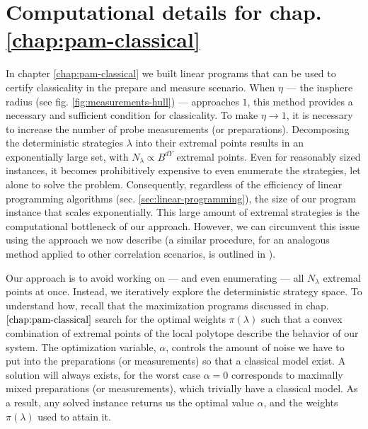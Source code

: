 \chapter{Computational details for chap. \ref{chap:pam-classical}}
\label{ap:a}
\label{ap:a-computational}

    In chapter \ref{chap:pam-classical} we built linear programs that can be used to certify classicality in the prepare and measure scenario. When $\eta$ --- the insphere radius (see fig. \ref{fig:measurements-hull}) --- approaches $1$, this method provides a necessary and sufficient condition for classicality. To make $\eta \rightarrow 1$, it is necessary to increase the number of probe measurements (or preparations). Decomposing the deterministic strategies $\lambda$ into their extremal points results in an exponentially large set, with $N_\lambda \propto B^{dY}$ extremal points. Even for reasonably sized instances, it becomes prohibitively expensive to even enumerate the strategies, let alone to solve the problem. Consequently, regardless of the efficiency of linear programming algorithms (sec. \ref{sec:linear-programming}), the size of our program instance that scales exponentially. This large amount of extremal strategies is the computational bottleneck of our approach. However, we can circumvent this issue using the approach we now describe (a similar procedure, for an analogous method applied to other correlation scenarios, is outlined in \cite{fillettaz_algorithmic_2018}).

	Our approach is to avoid working on --- and even enumerating --- all $N_\lambda$ extremal points at once. Instead, we iteratively explore the deterministic strategy space. To understand how, recall that the maximization programs discussed in chap. $\ref{chap:pam-classical}$ search for the optimal weights $\pi(\lambda)$ such that a convex combination of extremal points of the local polytope describe the behavior of our system. The optimization variable, $\alpha$, controls the amount of noise we have to put into the preparations (or measurements) so that a classical model exist. A solution will always exists, for the worst case $\alpha = 0$ corresponds to maximally mixed preparations (or measurements), which trivially have a classical model. As a result, any solved instance returns us the optimal value $\alpha$, and the weights $\pi(\lambda)$ used to attain it.

